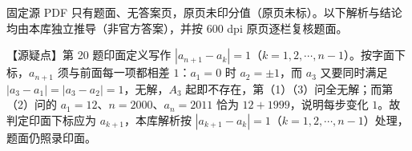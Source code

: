 

\begin{gktip}
固定源 PDF 只有题面、无答案页，原页未印分值（原页未标）。以下解析与结论均由本库独立推导（非官方答案），并按 600 dpi 原页逐栏复核题面。

【源疑点】第 20 题印面定义写作 $|a_{n+1}-a_k|=1$（$k=1,2,\cdots,n-1$）。按字面下标，$a_{n+1}$ 须与前面每一项都相差 $1$：$a_1=0$ 时 $a_2=\pm1$，而 $a_3$ 又要同时满足 $|a_3-a_1|=|a_3-a_2|=1$，无解，$A_3$ 起即不存在，第（1）（3）问全无解；而第（2）问的 $a_1=12$、$n=2000$、$a_n=2011$ 恰为 $12+1999$，说明每步变化 $1$。故判定印面下标应为 $a_{k+1}$，本库解析按 $|a_{k+1}-a_k|=1$（$k=1,2,\cdots,n-1$）处理，题面仍照录印面。
\end{gktip}

